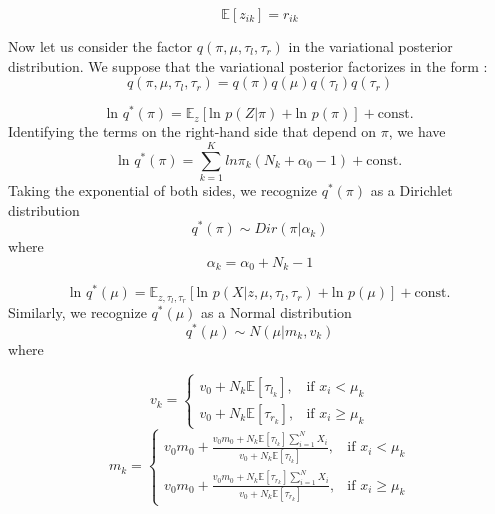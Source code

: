 \documentclass[runningheads]{llncs}
\begin{document}

\begin{equation}
\mathbb{E}[z_{ik}] = r_{ik}
\end{equation}

Now let us consider the factor $q(\pi,\mu,\tau_l,\tau_r)$ in the variational posterior distribution.
We suppose that the variational posterior factorizes in the form :
\begin{equation}
   q(\pi,\mu,\tau_l,\tau_r) = q(\pi)q(\mu)q(\tau_l)q(\tau_r) 
\end{equation}
   

\begin{equation}
   \text{ln }q^*(\pi) = \mathbb{E}_z[\text{ln }p(Z|\pi) + \text{ln }p(\pi)] + \text{const.}
\end{equation}
Identifying the terms on the right-hand side that depend on $\pi$, we have
\begin{equation}
   \text{ln }q^*(\pi) = \sum_{k=1}^{K}ln\pi_k(N_k +\alpha_0 - 1) + \text{const.}
\end{equation}
Taking the exponential of both sides, we recognize
$q^*(\pi)$ as a Dirichlet distribution
\begin{equation}
   q^*(\pi)	\sim Dir(\pi|\alpha_k)
\end{equation}
where 
\begin{equation}
 \alpha_k = \alpha_0+ N_k-1
\end{equation}


\begin{equation}
   \text{ln }q^*(\mu) = \mathbb{E}_{z,\tau_l,\tau_r}[\text{ln }p(X|z,\mu,\tau_l,\tau_r) + \text{ln }p(\mu)] + \text{const.}
\end{equation}
Similarly, we recognize $q^*(\mu)$ as a Normal distribution 
\begin{equation}
   q^*(\mu)	\sim N(\mu|m_k,v_k)
\end{equation}
where 

\begin{equation} 
   v_k=
   \begin{cases}
   v_0+N_k\mathbb{E}[\tau_{l_k}],& \text{if } x_{i}<\mu_{k}
   \\v_0+N_k\mathbb{E}[\tau_{r_k}],& \text{if } x_{i}\geq\mu_{k}
   \end{cases}
\end{equation}
\begin{equation} 
   m_k=
   \begin{cases}
   v_0m_0+ \frac{v_0m_0+ N_k\mathbb{E}[\tau_{l_k}]\sum_{i=1}^{N}X_i}{v_0+N_k\mathbb{E}[\tau_{l_k}]}
   ,& \text{if } x_{i}<\mu_{k}
   \\v_0m_0+ \frac{v_0m_0+ N_k\mathbb{E}[\tau_{r_k}]\sum_{i=1}^{N}X_i}{v_0+N_k\mathbb{E}[\tau_{r_k}]}
   ,& \text{if } x_{i}\geq\mu_{k}
   \end{cases}
\end{equation}
\end{document}

